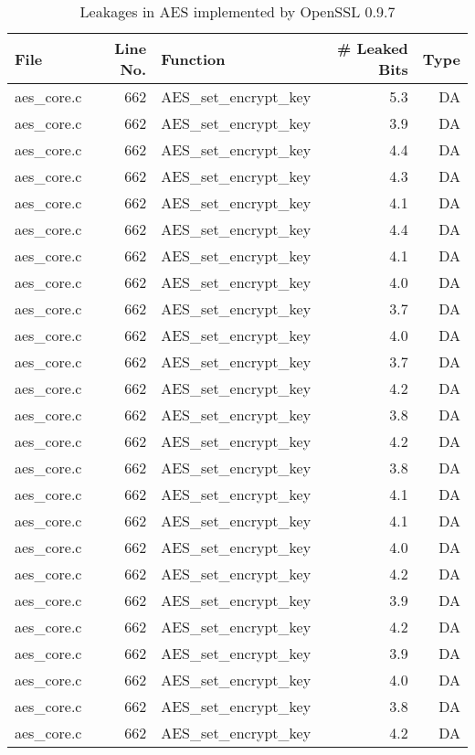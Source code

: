 \begin{table}[!ht]
\centering\tiny\scriptsize
\caption{Leakages in AES implemented by OpenSSL 0.9.7}\label{tab:AESOpenSSL0.9.7}
\begin{tabular}{lrlrr}
\hline
\textbf{File} & \textbf{Line No.} & \textbf{Function} & \textbf{\# Leaked Bits} & \textbf{Type} \\\hline
aes\_core.c& 662&AES\_set\_encrypt\_key&5.3 &DA\\
aes\_core.c& 662&AES\_set\_encrypt\_key&3.9 &DA\\
aes\_core.c& 662&AES\_set\_encrypt\_key&4.4 &DA\\
aes\_core.c& 662&AES\_set\_encrypt\_key&4.3 &DA\\
aes\_core.c& 662&AES\_set\_encrypt\_key&4.1 &DA\\
aes\_core.c& 662&AES\_set\_encrypt\_key&4.4 &DA\\
aes\_core.c& 662&AES\_set\_encrypt\_key&4.1 &DA\\
aes\_core.c& 662&AES\_set\_encrypt\_key&4.0 &DA\\
aes\_core.c& 662&AES\_set\_encrypt\_key&3.7 &DA\\
aes\_core.c& 662&AES\_set\_encrypt\_key&4.0 &DA\\
aes\_core.c& 662&AES\_set\_encrypt\_key&3.7 &DA\\
aes\_core.c& 662&AES\_set\_encrypt\_key&4.2 &DA\\
aes\_core.c& 662&AES\_set\_encrypt\_key&3.8 &DA\\
aes\_core.c& 662&AES\_set\_encrypt\_key&4.2 &DA\\
aes\_core.c& 662&AES\_set\_encrypt\_key&3.8 &DA\\
aes\_core.c& 662&AES\_set\_encrypt\_key&4.1 &DA\\
aes\_core.c& 662&AES\_set\_encrypt\_key&4.1 &DA\\
aes\_core.c& 662&AES\_set\_encrypt\_key&4.0 &DA\\
aes\_core.c& 662&AES\_set\_encrypt\_key&4.2 &DA\\
aes\_core.c& 662&AES\_set\_encrypt\_key&3.9 &DA\\
aes\_core.c& 662&AES\_set\_encrypt\_key&4.2 &DA\\
aes\_core.c& 662&AES\_set\_encrypt\_key&3.9 &DA\\
aes\_core.c& 662&AES\_set\_encrypt\_key&4.0 &DA\\
aes\_core.c& 662&AES\_set\_encrypt\_key&3.8 &DA\\
aes\_core.c& 662&AES\_set\_encrypt\_key&4.2 &DA\\

\end{tabular}
\end{table}
